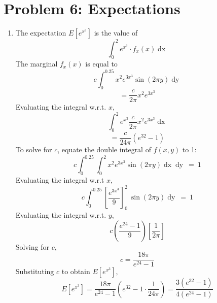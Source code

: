 \documentclass[a4paper]{article}
\begin{document}
\section{Problem 6: Expectations}
\begin{enumerate}
\item The expectation $E[e^{x^3}]$  is the value of
\begin{equation}
\int_0^2e^{x^3}\cdot f_x\left(x\right)\mathop{dx}
\end{equation}
The marginal $f_x(x)$ is equal to
\begin{equation}
c\int_0^{0.25}x^2e^{3x^3}\sin(2\pi y)\mathop{dy}
\end{equation}
\begin{equation}
= \frac{c}{2\pi}x^2e^{3x^3}
\end{equation}
Evaluating the integral w.r.t. $x$,
\begin{equation}
\int_0^2e^{x^3}\frac{c}{2\pi}x^2e^{3x^3}\mathop{dx}
\end{equation}
\begin{equation}
= \frac{c}{24\pi}(e^32-1)
\end{equation}
To solve for $c$, equate the double integral of $f(x,y)$ to 1:
\begin{equation}
c\int_0^{0.25}\int_0^2x^2e^{3x^3}\sin\left(2\pi y\right)\mathop{dx}\mathop{dy}\ =\ 1
\end{equation}
Evaluating the integral w.r.t $x$,
\begin{equation}
c\int_0^{0.25}\left[\frac{e^{3x^3}}{9}\right]_0^2\ \sin\left(2\pi y\right)\mathop{dy}\ =\ 1
\end{equation}
Evaluating the integral w.r.t. $y$,
\begin{equation}
c\left(\frac{e^{24}-1}{9}\right)\left[\frac{1}{2\pi}\right]
\end{equation}
Solving for $c$,
\begin{equation}
c=\frac{18\pi}{e^{24}-1}
\end{equation}
Substituting $c$ to obtain $E[e^{x^3}]$,
\begin{equation}
E[e^{x^3}]=\frac{18\pi}{e^{24}-1}\left(e^{32}-1\cdot\frac{1}{24\pi}\right)
= \frac{3(e^{32}-1)}{4(e^{24}-1)}
\end{equation}


\end{enumerate}
\end{document}
